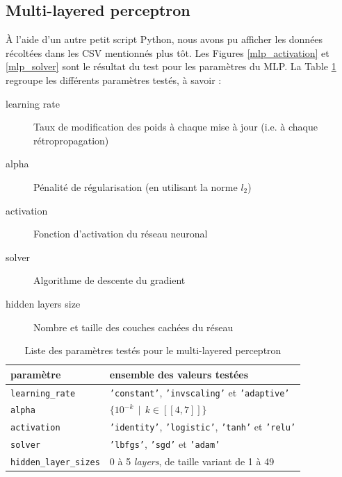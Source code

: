\documentclass[a4paper]{report}
\begin{document}

\subsection{Multi-layered perceptron}

À l'aide d'un autre petit script Python, nous avons pu afficher les données récoltées dans les CSV mentionnés plus tôt. Les Figures \ref{mlp_activation} et \ref{mlp_solver} sont le résultat du test pour les paramètres du MLP. La Table \ref{params_mlp} regroupe les différents paramètres testés, à savoir :
\begin{description}
\item[learning rate] Taux de modification des poids à chaque mise à jour (i.e. à chaque rétropropagation)
\item[alpha] Pénalité de régularisation (en utilisant la norme $l_2$)
\item[activation] Fonction d'activation du réseau neuronal
\item[solver] Algorithme de descente du gradient
\item[hidden layers size] Nombre et taille des couches cachées du réseau
\end{description}

\begin{table}
\centering
\begin{tabular}{l l}
paramètre & ensemble des valeurs testées \\
\hline
\texttt{learning\_rate} & \texttt{'constant'}, \texttt{'invscaling'} et \texttt{'adaptive'}\\
\texttt{alpha} & $\{10^{-k} \>\> | \>\> k \in [\![4, 7]\!] \}$ \\
\texttt{activation} & \texttt{'identity'}, \texttt{'logistic'}, \texttt{'tanh'} et \texttt{'relu'} \\
\texttt{solver} &\texttt{'lbfgs'}, \texttt{'sgd'} et \texttt{'adam'}\\
\texttt{hidden\_layer\_sizes} & 0 à 5 \emph{layers}, de taille variant de 1 à 49\\
\end{tabular}
\caption{Liste des paramètres testés pour le multi-layered perceptron\label{params_mlp}}
\end{table}
\end{document}
